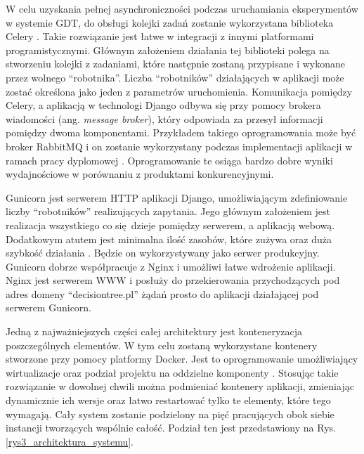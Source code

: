 W celu uzyskania pełnej asynchroniczności podczas uruchamiania eksperymentów w systemie GDT, do obsługi kolejki zadań zostanie wykorzystana biblioteka Celery \cite{misc_celery}. Takie rozwiązanie jest łatwe w integracji z innymi platformami programistycznymi. Głównym założeniem działania tej biblioteki polega na stworzeniu kolejki z zadaniami, które następnie zostaną przypisane i wykonane przez wolnego \enquote{robotnika}. Liczba \enquote{robotników} działających w aplikacji może zostać określona jako jeden z parametrów uruchomienia. Komunikacja pomiędzy Celery, a aplikacją w technologi Django odbywa się przy pomocy brokera wiadomości (ang. \textit{message broker}), który odpowiada za przesył informacji pomiędzy dwoma komponentami. Przykładem takiego oprogramowania może być broker RabbitMQ i on zostanie wykorzystany podczas implementacji aplikacji w ramach pracy dyplomowej \cite{misc_rabbit}. Oprogramowanie te osiąga bardzo dobre wyniki wydajnościowe w porównaniu z produktami konkurencyjnymi.

Gunicorn jest serwerem HTTP aplikacji Django, umożliwiającym zdefiniowanie liczby \enquote{robotników}  realizujących zapytania. Jego głównym założeniem jest realizacja wszystkiego co się dzieje pomiędzy serwerem, a aplikacją webową. Dodatkowym atutem jest minimalna ilość zasobów, które zużywa oraz duża szybkość działania \cite{misc_gunicorn}. Będzie on wykorzystywany jako serwer produkcyjny. Gunicorn dobrze współpracuje z Nginx i umożliwi łatwe wdrożenie aplikacji. Nginx jest serwerem WWW i posłuży do przekierowania przychodzących pod adres domeny \enquote{decisiontree.pl} żądań prosto do aplikacji działającej pod serwerem Gunicorn.

Jedną z najważniejszych części całej architektury jest konteneryzacja poszczególnych elementów. W tym celu zostaną wykorzystane kontenery stworzone przy pomocy platformy Docker. Jest to oprogramowanie umożliwiający wirtualizacje oraz podział projektu na oddzielne komponenty \cite{misc_docker}. Stosując takie rozwiązanie w dowolnej chwili można podmieniać kontenery aplikacji, zmieniając dynamicznie ich wersje oraz łatwo restartować tylko te elementy, które tego wymagają. Cały system zostanie podzielony na pięć pracujących obok siebie instancji tworzących wspólnie całość. Podział ten jest przedstawiony na Rys. \ref{rys3_architektura_systemu}.


 
 





